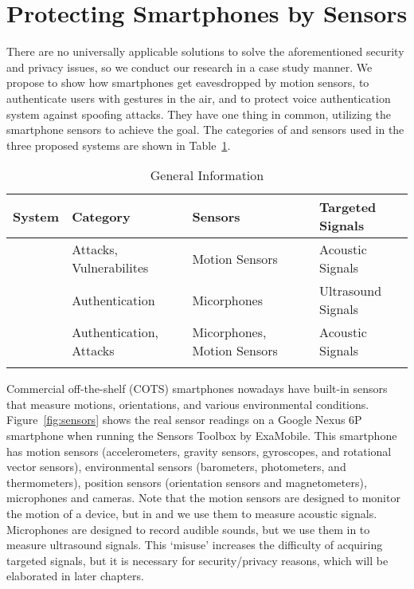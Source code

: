 \section{Protecting Smartphones by Sensors}
There are no universally applicable solutions to solve the aforementioned security and privacy issues, so we conduct our research in a case study manner. We propose {\spp} to show how smartphones get eavesdropped  by motion sensors, {\uu} to authenticate users with gestures in the air, and {\mv} to protect voice authentication system against spoofing attacks. They have one thing in common, utilizing the smartphone sensors to achieve the goal. The categories of and sensors used in the three proposed systems are shown in Table~\ref{tab:general}.

\begin{table}
	\caption{General Information}
	\label{tab:general}
	\centering
	\begin{tabular}{llll}
		\toprule
		System & Category & Sensors & Targeted Signals\\
		\midrule
		{\spp} 	& Attacks, Vulnerabilites & Motion Sensors& Acoustic Signals\\
		{\uu}& Authentication & Micorphones& Ultrasound Signals\\
		{\mv}& Authentication, Attacks & Micorphones, Motion Sensors & Acoustic Signals\\
		\bottomrule& 
	\end{tabular}
\end{table}

Commercial off-the-shelf (COTS) smartphones nowadays have built-in sensors that measure motions, orientations, and various environmental conditions. Figure~\ref{fig:sensors} shows the real sensor readings on a Google Nexus 6P smartphone when running the Sensors Toolbox by ExaMobile. This smartphone has motion sensors (accelerometers, gravity sensors, gyroscopes, and rotational vector sensors), environmental sensors (barometers, photometers, and thermometers), position sensors (orientation sensors and magnetometers), microphones and cameras. Note that the motion sensors are designed to monitor the motion of a device, but in {\spp} and {\mv} we use them to measure acoustic signals. Microphones are designed to record audible sounds, but we use them in {\uu} to measure ultrasound signals.
This `misuse' increases the difficulty of acquiring targeted signals, but it is necessary for security/privacy reasons, which will be elaborated in later chapters.


